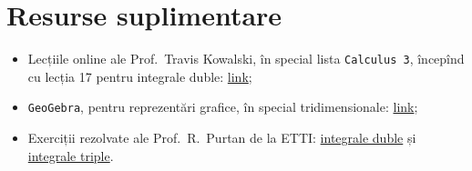\section{Resurse suplimentare}

\begin{itemize}
    \item Lecțiile online ale Prof.\ Travis Kowalski, în special lista
        \texttt{Calculus 3}, începînd cu lecția 17 pentru integrale duble:
        \href{https://www.youtube.com/watch?v=le1JlwBkAog&list=PLE7F8F33E161D1425&index=23}{link};
    \item \texttt{GeoGebra}, pentru reprezentări grafice, în special
        tridimensionale: \href{https://www.geogebra.org/3d?lang=en}{link};
    \item Exerciții rezolvate ale Prof.\ R.\ Purtan de la ETTI:
        \href{https://adrianmanea.xyz/docs/18-19-etti-am1/purtan-int-duble.pdf}{integrale duble}
        și \href{https://adrianmanea.xyz/docs/18-19-etti-am1/purtan-int-triple.pdf}{integrale triple}.
\end{itemize}


